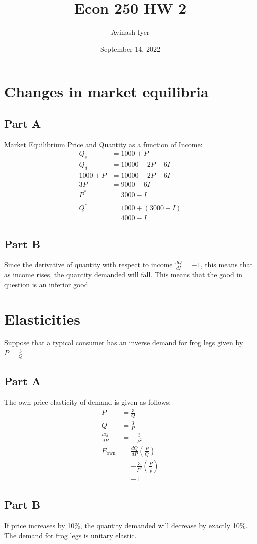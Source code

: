 \documentclass[8pt]{extarticle}
\title{Econ 250 HW 2}
\author{Avinash Iyer}
\date{September 14, 2022}
\newcommand{\plain}[1]{\textrm{#1}}
\begin{document}
{
\maketitle
\section*{Changes in market equilibria}
\subsection*{Part A}
Market Equilibrium Price and Quantity as a function of Income:
\begin{align*}
Q_s &= 1000+P \\
Q_d &= 10000 - 2P - 6I \\
1000+P &= 10000 - 2P - 6I \\
3P &= 9000 - 6I \\
P^{*} &= \boxed{3000-I} \\
\\
Q^{*} &= 1000 + (3000 - I)\\
&= \boxed{4000-I}
\end{align*}
\subsection*{Part B}
Since the derivative of quantity with respect to income $\frac{dQ}{dI} = -1$, this means that as income rises, the quantity demanded will fall. This means that the good in question is an inferior good.
\section*{Elasticities}
Suppose that a typical consumer has an inverse demand for frog legs given by $P = \frac{3}{Q}$.
\subsection*{Part A}
The own price elasticity of demand is given as follows:
\begin{align*}
	P &= \frac{3}{Q}\\
	Q &= \frac{3}{P}\\
	\frac{dQ}{dP} &= -\frac{3}{P^2} \\
	E_{\plain{own}} &= \frac{dQ}{dP}\left(\frac{P}{Q}\right) \\
	&= -\frac{3}{P^2}\left(\frac{P}{\frac{3}{P}}\right)\\
	&= \boxed{-1}
\end{align*}
\subsection*{Part B}
If price increases by 10\%, the quantity demanded will decrease by exactly 10\%. The demand for frog legs is unitary elastic.
\pagebreak
}
\end{document}
